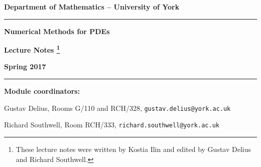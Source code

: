 \documentclass[11pt, a4paper]{article}
\begin{document}
{\Large
\centerline{\bf Department of Mathematics -- University of York}
\vskip 0.5cm

\hrule \vspace*{10mm}


\centerline{\bf Numerical Methods for PDEs}

\medskip
\centerline{\bf Lecture Notes
\footnote{These lecture notes were written by Kostia Ilin and edited by
Gustav Delius and Richard Southwell.}}
\bigskip

\centerline{\bf Spring 2017}
}
\vspace*{10mm}

\hrule
\vspace*{5mm}

 
{\bf Module coordinators:} 

Gustav Delius, Rooms G/110 and RCH/328, {\tt gustav.delius@york.ac.uk}

Richard Southwell, Room RCH/333, {\tt richard.southwell@york.ac.uk}

\tableofcontents











\end{document}
